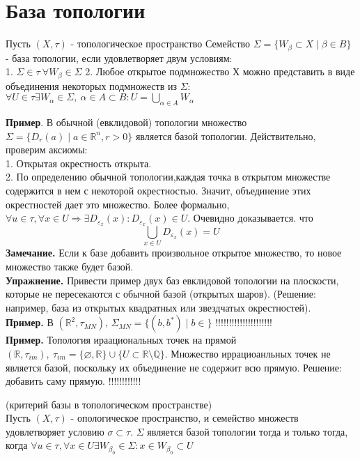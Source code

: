 \section{База топологии}
\begin{defin}
    Пусть $(X,\tau)$ - топологическое пространство
    Семейство  $\Sigma=\{W_\beta\subset X\mid \beta\in B \} $ - база топологии,
    если удовлетворяет двум условиям:\\
    1. $\Sigma\in\tau~\forall W_\beta\in\Sigma$
    2. Любое открытое подмножество Х можно представить в виде
    объединения некоторых подмножеств из $\Sigma$: 
    $\forall U\in\tau\exists W_\alpha\in\Sigma,~\alpha\in A\subset B:
    U=\bigcup\limits_{\alpha\in A}W_\alpha $
\end{defin}
\textbf{Пример}. В обычной (евклидовой) топологии множество 
$\Sigma=\{D_r(a)\mid a\in\mathbb{R}^n,r>0\}$ является базой топологии.
Действительно, проверим аксиомы:\\
1. Открытая окрестность открыта.\\
2. По определению обычной топологии,каждая точка в открытом множестве
содержится в нем с некоторой окрестностью. Значит, объединение этих
окрестностей дает это множество. Более формально,
$\forall u\in\tau,\forall x\in U\Rightarrow \exists D_{\varepsilon_x}(x):
D_{\varepsilon_x}(x)\in U$. Очевидно доказывается. что 
$$\boxed{\bigcup_{x\in U}D_{\varepsilon_x}(x)=U}$$ 
\textbf{Замечание.} Если к базе добавить произвольное открытое множество, то
новое множество также будет базой.\\
\textbf{Упражнение.} Привести пример двух баз евклидовой топологии на 
плоскости, которые не пересекаются с обычной базой (открытых шаров). 
(Решение: например, база из открытых квадратных или звездчатых окрестностей).\\
\textbf{Пример.} В $(\mathbb{R}^2,\tau_{MN})$, 
$\Sigma_{MN}=\{(b,b^*)\mid b\in\} $ !!!!!!!!!!!!!!!!!!!!!\\
\textbf{Пример.} Топология ираациональных точек на прямой
$(\mathbb{R},\tau_{im}),~\tau_{im}=\{\varnothing,\mathbb{R}\}\cup
\{U\subset \mathbb{R}\setminus\mathbb{Q}\} $.
Множество иррациоанльных точек не является базой, поскольку их объединение не
содержит всю прямую. Решение: добавить саму прямую. !!!!!!!!!!!!\\
\begin{theor}
    (критерий базы в топологическом пространстве)\\
    Пусть $(X,\tau)$ - опологическое пространство, и семейство множеств 
    удовлетворяет условию $\sigma\subset \tau$. $\Sigma$ является базой 
    топологии тогда и только тогда, когда 
    $\forall u\in\tau,\forall x\in U\exists W_{\beta_0}\in\Sigma:
    x\in W_{\beta_0}\subset U$
\end{theor}

